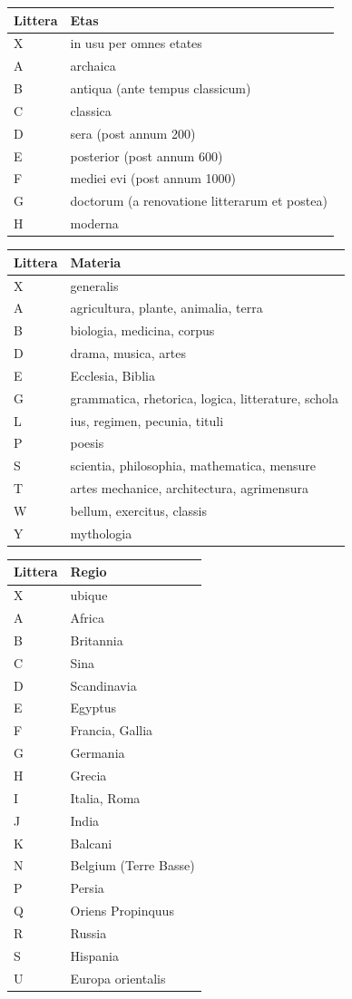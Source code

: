 \documentclass[12pt,
              article,
              oneside
              ]{memoir}
\begin{document}
\begin{longtable}{@{}lp{}@{}}
\toprule
Littera & Etas\\
\midrule
\endhead
X & in usu per omnes etates\\
A & archaica\\
B & antiqua (ante tempus classicum)\\
C & classica\\
D & sera (post annum 200)\\
E & posterior (post annum 600)\\
F & mediei evi (post annum 1000)\\
G & doctorum (a renovatione litterarum et postea)\\
H & moderna\\
\bottomrule
\end{longtable}

\begin{longtable}{@{}lp{}@{}}
\toprule
Littera & Materia\\
\midrule
\endhead
X & generalis\\
A & agricultura, plante, animalia, terra\\
B & biologia, medicina, corpus\\
D & drama, musica, artes\\
E & Ecclesia, Biblia\\
G & grammatica, rhetorica, logica, litterature, schola\\
L & ius, regimen, pecunia, tituli\\
P & poesis\\
S & scientia, philosophia, mathematica, mensure\\
T & artes mechanice, architectura, agrimensura\\
W & bellum, exercitus, classis\\
Y & mythologia\\
\bottomrule
\end{longtable}

\begin{longtable}{@{}lp{}@{}}
\toprule
Littera & Regio\\
\midrule
\endhead
X & ubique\\
A & Africa\\
B & Britannia\\
C & Sina\\
D & Scandinavia\\
E & Egyptus\\
F & Francia, Gallia\\
G & Germania\\
H & Grecia\\
I & Italia, Roma\\
J & India\\
K & Balcani\\
N & Belgium (Terre Basse)\\
P & Persia\\
Q & Oriens Propinquus\\
R & Russia\\
S & Hispania\\
U & Europa orientalis\\
\bottomrule
\end{longtable}
\end{document}
